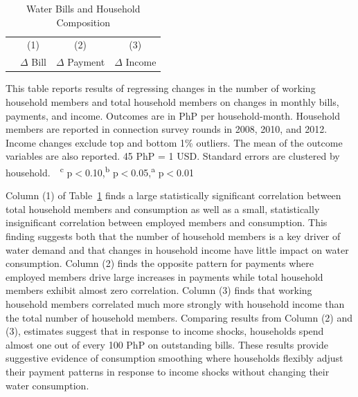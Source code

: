 \documentclass[12pt,table]{article}
\begin{document}
\begin{table}[!ht]
\small
\centering
\begin{threeparttable}
\caption{Water Bills and Household Composition}\label{table:panelanalysis}
\vspace{-2mm}
\begin{tabular}{@{}lccc@{}}
\toprule
 & \small (1) & \small (2) & \small (3)  \\
 & \small $\Delta$ Bill & \small $\Delta$ Payment & \small $\Delta$ Income \\[.5em]
 \toprule

\bottomrule
\end{tabular}
\begin{tablenotes}
\footnotesize
\item 
This table reports results of regressing changes in the number of working household members and total household members on changes in monthly bills, payments, and income.  Outcomes are in PhP per household-month.  Household members are reported in connection survey rounds in 2008, 2010, and 2012.  Income changes exclude top and bottom 1\% outliers.  The mean of the outcome variables are also reported. 45 PhP = 1 USD.  Standard errors are clustered by household.  \,\, \textsuperscript{c} p$<$0.10,\textsuperscript{b} p$<$0.05,\textsuperscript{a} p$<$0.01 
\end{tablenotes}
\end{threeparttable}
\end{table}

Column (1) of Table~\ref{table:panelanalysis} finds a large statistically significant correlation between total household members and consumption as well as a small, statistically insignificant correlation between employed members and consumption.  This finding suggests both that the number of household members is a key driver of water demand and that changes in household income have little impact on water consumption.  Column (2) finds the opposite pattern for payments where employed members drive large increases in payments while total household members exhibit almost zero correlation.  Column (3) finds that working household members correlated much more strongly with household income than the total number of household members.  Comparing results from Column (2) and (3), estimates suggest that in response to income shocks, households spend almost one out of every 100 PhP on outstanding bills.  These results provide suggestive evidence of consumption smoothing where households flexibly adjust their payment patterns in response to income shocks without changing their water consumption.  
\end{document}
